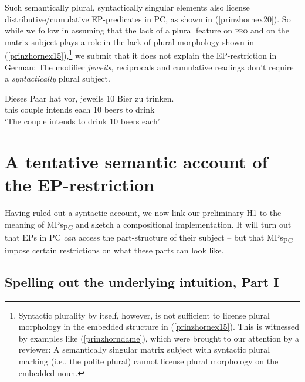 \documentclass[output=paper]{langscibook}
\begin{document}
Such semantically plural, syntactically singular elements also license distributive\slash cumulative EP-predicates in PC, as shown in (\ref{prinzhornex20}). So while we follow \citet{Landau:2000} in assuming that the lack of a plural feature on \textsc{pro} and on the matrix subject plays a role in the lack of plural morphology shown in (\ref{prinzhornex15}),\footnote{Syntactic plurality by itself, however, is not sufficient to license plural morphology in the embedded structure in (\ref{prinzhornex15}). This is witnessed by examples like (\ref{prinzhorndame}), which were brought to our attention by a reviewer: A  semantically singular matrix subject with syntactic plural marking (i.e., the polite plural) cannot license plural morphology on the embedded noun.


\z

} we submit that it does not explain the EP-restriction in German: The modifier \textit{jeweils}, reciprocals and cumulative readings don't require a \textit{syntactically} plural subject.



\ea \label{prinzhornex20}
\gll Dieses Paar {hat vor}, jeweils 10 Bier zu trinken.\\
this couple intends  each 10 beers to drink\\
\glt `The couple intends to drink 10 beers each' 
\z



\section{A tentative semantic account of the EP-restriction}\label{prinzhornsec:4}

Having ruled out a syntactic account, we now link our preliminary H1 to the meaning of MPs\textsubscript{PC} and sketch a compositional implementation. It will turn out that EPs in PC \textit{can} access the part-structure of their subject -- but that MPs\textsubscript{PC} impose certain restrictions on what these parts can look like.



\subsection{Spelling out the underlying intuition, Part I}\label{prinzhornsec:4.1}
\end{document}
